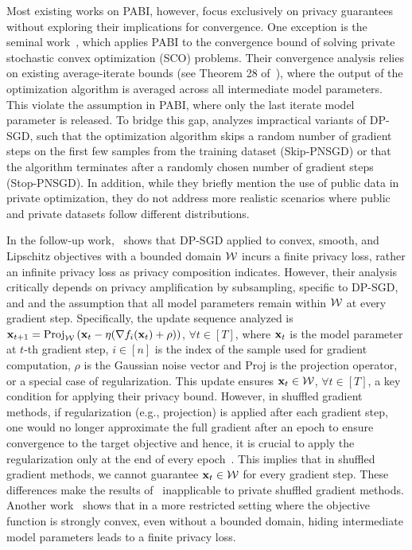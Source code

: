 Most existing works on PABI, however, focus exclusively on privacy guarantees without exploring their implications for convergence. One exception is the seminal work~\cite{Feldman2018privacy_amp_iter}, which applies PABI to the convergence bound of solving private stochastic convex optimization (SCO) problems.
Their convergence analysis relies on existing average-iterate bounds (see Theorem 28 of~\cite{Feldman2018privacy_amp_iter}), where the output of the optimization algorithm is averaged across all intermediate model parameters. This violate the assumption in PABI, where only the last iterate model parameter is released. 
To bridge this gap, \cite{Feldman2018privacy_amp_iter} analyzes impractical variants of DP-SGD, such that the optimization algorithm skips a random number of gradient steps on the first few samples from the training dataset (Skip-PNSGD) or that the algorithm terminates after a randomly chosen number of gradient steps (Stop-PNSGD). 
In addition, while they briefly mention the use of public data in private optimization, they do not address more realistic scenarios where public and private datasets follow different distributions.

In the follow-up work,~\cite{altschuler2022apple_paper} shows that DP-SGD applied to convex, smooth, and Lipschitz objectives with a bounded domain ${\mathcal{W}}$ incurs a finite privacy loss, rather an infinite privacy loss as privacy composition indicates. However, their analysis critically depends on privacy amplification by subsampling, specific to DP-SGD, and and the assumption that all model parameters remain within ${\mathcal{W}}$ at every gradient step. 
Specifically, the update sequence analyzed is ${\mathbf{x}}_{t+1} = \text{Proj}_{{\mathcal{W}}}\left( {\mathbf{x}}_{t} - \eta (\nabla f_i({\mathbf{x}}_t) + \rho) \right)$, $\forall t\in [T]$, where ${\mathbf{x}}_t$ is the model parameter at $t$-th gradient step, $i \in [n]$ is the index of the sample used for gradient computation, $\rho$ is the Gaussian noise vector and $\text{Proj}$ is the projection operator, or a special case of regularization. 
This update ensures ${\mathbf{x}}_t \in {\mathcal{W}}$, $\forall t\in [T]$, a key condition for applying their privacy bound.
However, in shuffled gradient methods, 
if regularization (e.g., projection) is applied after each gradient step, 
one would no longer approximate the full gradient after an epoch to ensure convergence to the target objective and hence, it is crucial to apply the regularization only at the end of every epoch~\cite{mishchenko2021prox_fed_rr}.
This implies that in shuffled gradient methods, we cannot guarantee ${\mathbf{x}}_t\in {\mathcal{W}}$ for every gradient step.
These differences make the results of~\cite{altschuler2022apple_paper} inapplicable to private shuffled gradient methods.
Another work~\cite{ye2022singapore_paper} shows that in a more restricted setting where the objective function is strongly convex, even without a bounded domain, hiding intermediate model parameters leads to a finite privacy loss. 



